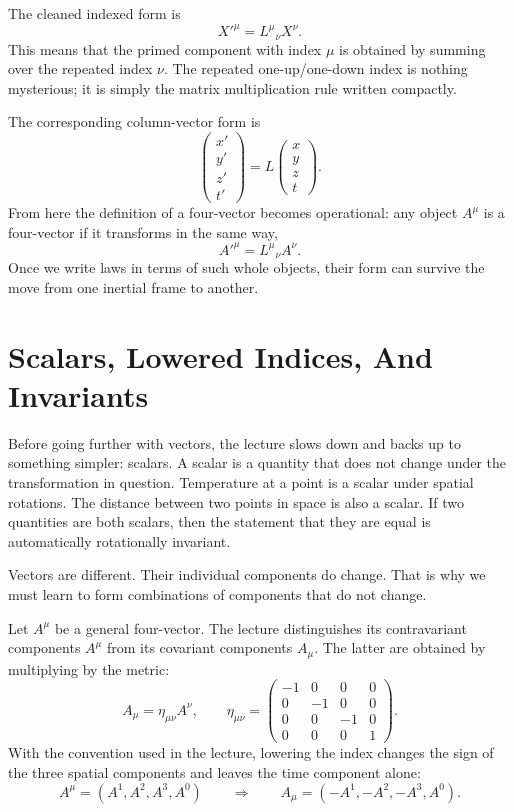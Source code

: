 The cleaned indexed form is
\begin{equation}
X'^{\mu}=L^{\mu}{}_{\nu}X^{\nu}.
\end{equation}
This means that the primed component with index \(\mu\) is obtained by summing over the repeated index \(\nu\). The repeated one-up/one-down index is nothing mysterious; it is simply the matrix multiplication rule written compactly.

The corresponding column-vector form is
\begin{equation}
\begin{pmatrix}
x'\\
y'\\
z'\\
t'
\end{pmatrix}
=
L
\begin{pmatrix}
x\\
y\\
z\\
t
\end{pmatrix}.
\end{equation}
From here the definition of a four-vector becomes operational: any object \(A^\mu\) is a four-vector if it transforms in the same way,
\begin{equation}
A'^{\mu}=L^{\mu}{}_{\nu}A^{\nu}.
\end{equation}
Once we write laws in terms of such whole objects, their form can survive the move from one inertial frame to another.

\section{Scalars, Lowered Indices, And Invariants}

Before going further with vectors, the lecture slows down and backs up to something simpler: scalars. A scalar is a quantity that does not change under the transformation in question. Temperature at a point is a scalar under spatial rotations. The distance between two points in space is also a scalar. If two quantities are both scalars, then the statement that they are equal is automatically rotationally invariant.

Vectors are different. Their individual components do change. That is why we must learn to form combinations of components that do not change.

Let \(A^\mu\) be a general four-vector. The lecture distinguishes its contravariant components \(A^\mu\) from its covariant components \(A_\mu\). The latter are obtained by multiplying by the metric:
\begin{equation}
A_{\mu}=\eta_{\mu\nu}A^{\nu},
\qquad
\eta_{\mu\nu}=
\begin{pmatrix}
-1&0&0&0\\
0&-1&0&0\\
0&0&-1&0\\
0&0&0&1
\end{pmatrix}.
\end{equation}
With the convention used in the lecture, lowering the index changes the sign of the three spatial components and leaves the time component alone:
\[
A^\mu=(A^1,A^2,A^3,A^0)
\qquad\Longrightarrow\qquad
A_\mu=(-A^1,-A^2,-A^3,A^0).
\]

